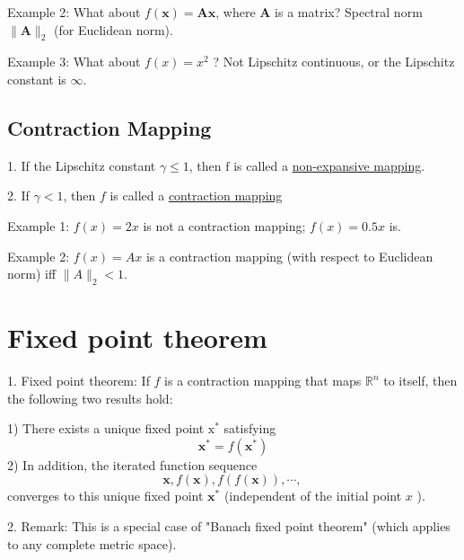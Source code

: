 \documentclass[11pt]{elegantbook}
\begin{document}
Example 2: What about $f(\mathbf{x})=\mathbf{A x}$, where $\mathbf{A}$ is a matrix? Spectral norm $\|\mathbf{A}\|_{2}$ (for Euclidean norm).

Example 3: What about $f(x)=x^{2}$ ?
Not Lipschitz continuous, or the Lipschitz constant is $\infty$.

\section{Contraction Mapping}
1. If the Lipschitz constant $\gamma \leq 1$, then $\mathrm{f}$ is called a \underline{non-expansive mapping}.

2. If $\gamma<1$, then $f$ is called a \underline{contraction mapping}

Example 1: $f(x)=2 x$ is not a contraction mapping; $f(x)=0.5 x$ is.

Example 2: $f(x)=A x$ is a contraction mapping (with respect to Euclidean norm) iff $\|A\|_{2}<1$.



\chapter{Fixed point theorem}
1. Fixed point theorem: If $f$ is a contraction mapping that maps $\mathbb{R}^{n}$ to itself, then the following two results hold:

1) There exists a unique fixed point $\mathrm{x}^{*}$ satisfying
$$
\mathbf{x}^{*}=f\left(\mathbf{x}^{*}\right)
$$
2) In addition, the iterated function sequence
$$
\mathbf{x}, f(\mathbf{x}), f(f(\mathbf{x})), \cdots \text {, }
$$
converges to this unique fixed point $\mathbf{x}^{*}$ (independent of the initial point $x$ ).

2. Remark: This is a special case of "Banach fixed point theorem" (which applies to any complete metric space).
\end{document}
